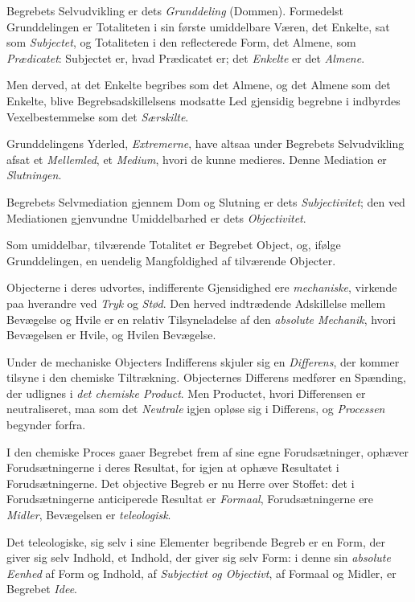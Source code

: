\documentclass[12pt]{book}
\begin{document}
Begrebets Selvudvikling er dets \emph{Grunddeling} (Dommen). Formedelst
Grunddelingen er Totaliteten i sin første umiddelbare Væren,
det Enkelte, sat som \emph{Subjectet}, og Totaliteten i den reflecterede
Form, det Almene, som \emph{Prædicatet}: Subjectet er, hvad Prædicatet
er; det \emph{Enkelte} er det \emph{Almene}.

Men derved, at det Enkelte begribes som det Almene, og det Almene
som det Enkelte, blive Begrebsadskillelsens modsatte Led gjensidig
begrebne i indbyrdes Vexelbestemmelse som det \emph{Særskilte}.

Grunddelingens Yderled, \emph{Extremerne}, have altsaa under Begrebets
Selvudvikling afsat et \emph{Mellemled}, et \emph{Medium}, hvori de
kunne medieres. Denne Mediation er \emph{Slutningen}.

Begrebets Selvmediation gjennem Dom og Slutning er dets \emph{Subjectivitet};
den ved Mediationen gjenvundne Umiddelbarhed er dets
\emph{Objectivitet}.

Som umiddelbar, tilværende Totalitet er Begrebet Object, og,
ifølge Grunddelingen, en uendelig Mangfoldighed af tilværende Objecter.

Objecterne i deres udvortes, indifferente Gjensidighed ere \emph{mechaniske},
virkende paa hverandre ved \emph{Tryk} og \emph{Stød}. Den herved indtrædende
Adskillelse mellem Bevægelse og Hvile er en relativ Tilsyneladelse
af den \emph{absolute Mechanik}, hvori Bevægelsen er Hvile, og
Hvilen Bevægelse.

Under de mechaniske Objecters Indifferens skjuler sig en \emph{Differens},
der kommer tilsyne i den chemiske Tiltrækning. Objecternes
Differens medfører en Spænding, der udlignes i \emph{det chemiske Product}.
Men Productet, hvori Differensen er neutraliseret, maa som det
\emph{Neutrale} igjen opløse sig i Differens, og \emph{Processen} begynder forfra.

I den chemiske Proces gaaer Begrebet frem af sine egne Forudsætninger,
ophæver Forudsætningerne i deres Resultat, for igjen at ophæve
Resultatet i Forudsætningerne. Det objective Begreb er nu Herre
over Stoffet: det i Forudsætningerne anticiperede Resultat er \emph{Formaal},
Forudsætningerne ere \emph{Midler}, Bevægelsen er \emph{teleologisk}.

Det teleologiske, sig selv i sine Elementer begribende Begreb er en
Form, der giver sig selv Indhold, et Indhold, der giver sig selv Form:
i denne sin \emph{absolute Eenhed} af Form og Indhold, af \emph{Subjectivt
og Objectivt}, af Formaal og Midler, er Begrebet \emph{Idee}.
\end{document}
